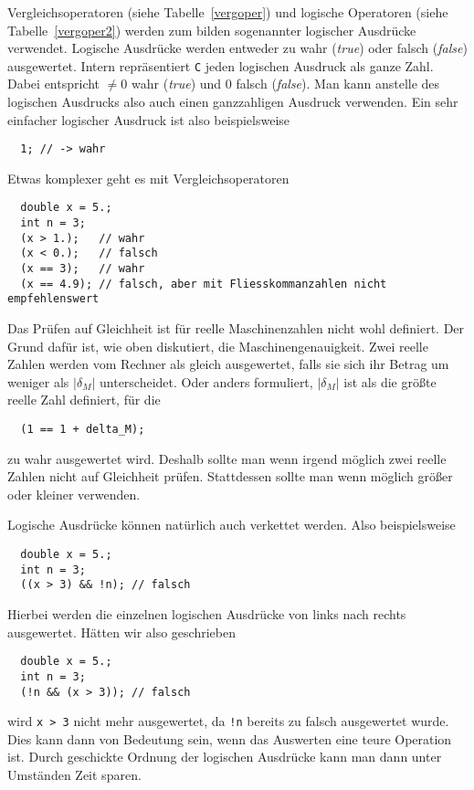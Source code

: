 Vergleichsoperatoren (siehe Tabelle~\ref{vergoper}) und logische Operatoren (siehe Tabelle~\ref{vergoper2}) werden zum bilden sogenannter logischer Ausdrücke verwendet.
Logische Ausdrücke werden entweder zu wahr (\emph{true}) oder falsch (\emph{false}) ausgewertet.
Intern repräsentiert \texttt{C} jeden logischen Ausdruck als ganze Zahl.
Dabei entspricht $\neq 0$ wahr (\emph{true}) und $0$ falsch (\emph{false}).
Man kann anstelle des logischen Ausdrucks also auch einen ganzzahligen Ausdruck verwenden.
Ein sehr einfacher logischer Ausdruck ist also beispielsweise
\begin{lstlisting}
  1; // -> wahr
\end{lstlisting}
Etwas komplexer geht es mit Vergleichsoperatoren
\begin{lstlisting}
  double x = 5.;
  int n = 3;
  (x > 1.);   // wahr
  (x < 0.);   // falsch
  (x == 3);   // wahr
  (x == 4.9); // falsch, aber mit Fliesskommanzahlen nicht empfehlenswert
\end{lstlisting}
Das Prüfen auf Gleichheit ist für reelle Maschinenzahlen nicht wohl definiert.
Der Grund dafür ist, wie oben diskutiert, die Maschinengenauigkeit.
Zwei reelle Zahlen werden vom Rechner als gleich ausgewertet, falls sie sich ihr Betrag um weniger als $|\delta_M|$ unterscheidet. 
Oder anders formuliert, $|\delta_M|$ ist als die größte reelle Zahl definiert, für die 
\begin{lstlisting}
  (1 == 1 + delta_M);
\end{lstlisting}
zu wahr ausgewertet wird.
Deshalb sollte man wenn irgend möglich zwei reelle Zahlen nicht auf Gleichheit prüfen.
Stattdessen sollte man wenn möglich größer oder kleiner verwenden.

Logische Ausdrücke können natürlich auch verkettet werden. 
Also beispielsweise
\begin{lstlisting}
  double x = 5.;
  int n = 3;
  ((x > 3) && !n); // falsch
\end{lstlisting}
Hierbei werden die einzelnen logischen Ausdrücke von links nach rechts ausgewertet. 
Hätten wir also geschrieben
\begin{lstlisting}
  double x = 5.;
  int n = 3;
  (!n && (x > 3)); // falsch
\end{lstlisting}
wird \verb|x > 3| nicht mehr ausgewertet, da \verb|!n| bereits zu falsch ausgewertet wurde.
Dies kann dann von Bedeutung sein, wenn das Auswerten eine teure Operation ist.
Durch geschickte Ordnung der logischen Ausdrücke kann man dann unter Umständen Zeit sparen.


